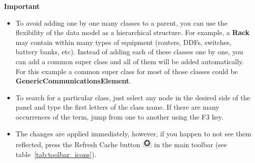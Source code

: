 \documentclass[a4paper]{article}
\begin{document}
	\begin{framed} {\large \textbf{Important}}
		\begin{itemize}
			\item To avoid adding one by one many classes to a parent, you can use the flexibility of the data model as a hierarchical structure. For example, a \textbf{Rack} may contain within many types of equipment (routers, DDFs, switches, battery banks, etc). Instead of adding each of these classes one by one, you can add a common super class and all of them will be added automatically. For this example a common super class for most of those classes could be \textbf{GenericCommunicationsElement}.
			\item To search for a particular class, just select any node in the desired side of the panel and type the first letters of the class name. If there are many occurrences of the term, jump from one to another using the F3 key.
			\item The changes are applied immediately, however, if you happen to not see them reflected, press the Refresh Cache button \includegraphics[width=0.5cm]{img/icon_refresh_cache.png} in the main toolbar (see table~\ref{tab:toolbar_icons}).
		\end{itemize}
	\end{framed}
			
	\clearpage
\end{document}
